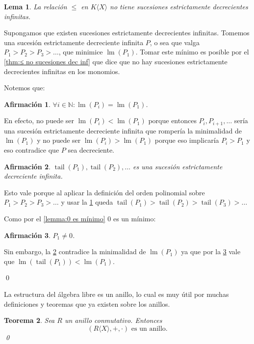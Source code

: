 \documentclass[12pt]{report}
\theoremstyle{customstyle}
\newtheorem{theorem}{Teorema}[chapter]
\newtheorem{lemma}[theorem]{Lema}
\renewenvironment{proof}[1][\proofname]{{\noindent \bfseries #1: }}{\qed} %
\theoremstyle{factstyle}
\newtheorem{fact}{Afirmación}[theorem]
\DeclareMathOperator{\lm}{lm}
\DeclareMathOperator{\tail}{tail}
\begin{document}
\begin{lemma}\label{lemma:≤ en KX no sucesiones dec inf}
  La relación $≤$ en $K⟨X⟩$ no tiene sucesiones estrictamente decrecientes infinitas.
\end{lemma}
\begin{proof}
  Supongamos que existen sucesiones estrictamente decrecientes infinitas. Tomemos una sucesión estrictamente decreciente infinita $P$, o sea que valga $P_1 > P_2 > P_3 > …$, que minimice $\lm(P_1)$. Tomar este mínimo es posible por el \cref{thm:≤ no sucesiones dec inf} que dice que no hay sucesiones estrictamente decrecientes infinitas en los monomios.

  Notemos que:

  \begin{fact}\label{fact:≤ en KX no sucesiones dec inf:1}
    $∀i ∈ ℕ : \lm(P_i) = \lm(P_1)$.
  \end{fact}
  En efecto, no puede ser $\lm(P_i) < \lm(P_1)$ porque entonces $P_i, P_{i + 1}, …$ sería una sucesión estrictamente decreciente infinita que rompería la minimalidad de $\lm(P_1)$ y no puede ser $\lm(P_i) > \lm(P_1)$ porque eso implicaría $P_i > P_1$ y eso contradice que $P$ sea decreciente.

  \begin{fact}\label{fact:≤ en KX no sucesiones dec inf:2}
    $\tail(P_1), \tail(P_2), …$ es una sucesión estrictamente decreciente infinita.
  \end{fact}
  Esto vale porque al aplicar la definición del orden polinomial sobre $P_1 > P_2 > P_3 > …$ y usar la \cref{fact:≤ en KX no sucesiones dec inf:1} queda $\tail(P_1) > \tail(P_2) > \tail(P_3) > …$

  Como por el \cref{lemma:0 es mínimo} $0$ es un mínimo:

  \begin{fact}\label{fact:≤ en KX no sucesiones dec inf:3}
    $P_1 ≠ 0$.
  \end{fact}

  Sin embargo, la \cref{fact:≤ en KX no sucesiones dec inf:2} contradice la minimalidad de $\lm(P_1)$ ya que por la \cref{fact:≤ en KX no sucesiones dec inf:3} vale que $\lm(\tail(P_1)) < \lm(P_1)$.

\end{proof}

La estructura del álgebra libre es un anillo, lo cual es muy útil por muchas definiciones y teoremas que ya existen sobre los anillos.

\begin{theorem}
  Sea $R$ un anillo conmutativo. Entonces
  \[ (R⟨X⟩, +, ·)\text{ es un anillo} \text{.}\]
  \qed
\end{theorem}
\end{document}
